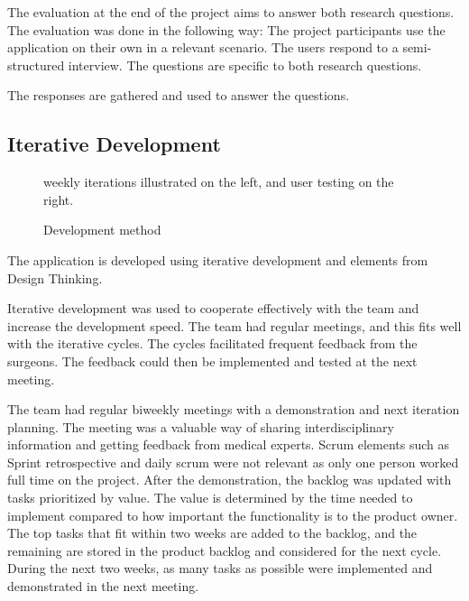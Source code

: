 \documentclass[a4paper]{report}
\begin{document}
The evaluation at the end of the project aims to answer both research questions. The evaluation was done in the following way:
The project participants use the application on their own in a relevant scenario.
The users respond to a semi-structured interview. The questions are specific to both research questions.

The responses are gathered and used to answer the questions.

\subsection{Iterative Development}

\begin{figure}[h!]
    \centering
	\hfill
  \caption{Development method}
  \small
  weekly iterations illustrated on the left, and user testing on the right.
\end{figure}

The application is developed using iterative development and elements from Design Thinking.

Iterative development was used to cooperate effectively with the team and increase the development speed. The team had regular meetings, and this fits well with the iterative cycles. The cycles facilitated frequent feedback from the surgeons. The feedback could then be implemented and tested at the next meeting.

The team had regular biweekly meetings with a demonstration and next iteration planning. The meeting was a valuable way of sharing interdisciplinary information and getting feedback from medical experts. Scrum elements such as Sprint retrospective and daily scrum were not relevant as only one person worked full time on the project.
After the demonstration, the backlog was updated with tasks prioritized by value. The value is determined by the time needed to implement compared to how important the functionality is to the product owner. The top tasks that fit within two weeks are added to the backlog, and the remaining are stored in the product backlog and considered for the next cycle.
During the next two weeks, as many tasks as possible were implemented and demonstrated in the next meeting.
\end{document}
